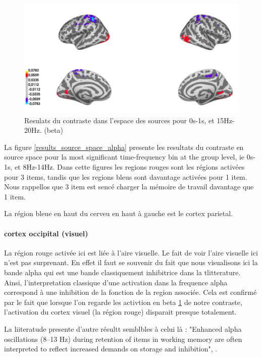 \begin{figure}[ht]
    \centering
    \includegraphics[width=13cm]{images_report/source/source_results_beta_1s.png}
    \caption[Resulats du contraste dans l'espace des sources.]%
    {Resulats du contraste dans l'espace des sources pour 0s-1s, et 15Hz-20Hz. (beta)}
    \label{results_source_space_beta}
\end{figure}
 
La figure \ref{results_source_space_alpha} presente les resultats du contraste en source space pour la most significant time-frequency bin at the group level, ie 0s-1s, et 8Hz-14Hz. Dans cette figures les regions rouges sont les régions activées pour 3 items, tandis que les regions bleus sont davantage activées pour 1 item. Nous rappellos que 3 item est sencé charger la mémoire de travail davantage que 1 item.

La région bleue en haut du cerveu en haut à gauche est le cortex parietal.

\paragraph{cortex occipital (visuel)}
La région rouge activée ici est liée à l'aire visuelle. Le fait de voir l'aire visuelle ici n'est pas surprenant. En effet il faut se souvenir du fait que nous visualisons ici la bande alpha qui est une bande classiquement inhibitrice dans la tlitterature. Ainsi, l'interpretation classique d'une activation dans la frequence alpha correspond à une inhibition de la fonction de la region associée. Cela est confirmé par le fait que lorsque l'on regarde les activtion en beta \ref{results_source_space_beta} de notre contraste, l'activation du cortex visuel (la région rouge) disparait presque totalement.

La liiteratude presente d'autre résultt semblbles à celui là : "Enhanced alpha oscillations (8–13 Hz) during retention of items in working memory are often interpreted to reflect increased demands on storage and inhibition", \cite{obleser2012adverse}.

